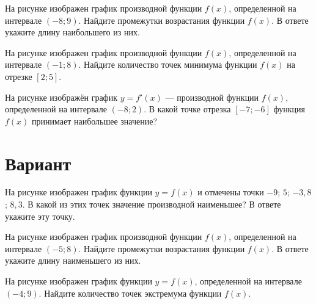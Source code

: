 \begin{taskBN}{2}
На рисунке изображен график производной функции $f(x)$, определенной на интервале $(-8;9)$. Найдите промежутки возрастания функции $f(x)$. В ответе укажите длину наибольшего из них.
\end{taskBN}

\begin{taskBN}{3}
На рисунке изображен график производной функции $f(x)$, определенной на интервале $(-1;8)$. Найдите количество точек минимума функции $f(x)$ на отрезке $[2;5]$. 
\end{taskBN}

\begin{taskBN}{4}
На рисунке изображён график $y=f'(x)$ — производной функции $f(x)$, определенной на интервале $(-8;2)$. В какой точке отрезка $[-7; -6]$ функция $f(x)$ принимает наибольшее значение?
\end{taskBN}

\newpage\section{Вариант}\begin{taskBN}{1}
На рисунке изображен график функции $y=f(x)$ и отмечены точки $-9$; $5$; $-3,8$; $8,3$. В какой из этих точек значение производной наименьшее? В ответе укажите эту точку. 
\end{taskBN}

\begin{taskBN}{2}
На рисунке изображен график производной функции $f(x)$, определенной на интервале $(-5;8)$. Найдите промежутки возрастания функции $f(x)$. В ответе укажите длину наименьшего из них.
\end{taskBN}

\begin{taskBN}{3}
На рисунке изображен график функции $y=f(x)$, определенной на интервале $(-4;9)$. Найдите количество точек экстремума функции $f(x)$.
\end{taskBN}

